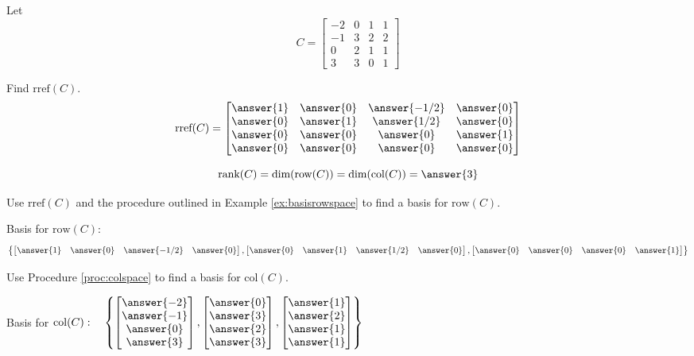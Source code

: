 \documentclass{ximera}
\begin{document}
\begin{problem}\label{prob:colrowmatrixC}
Let
$$C=\begin{bmatrix}-2&0&1&1\\-1&3&2&2\\0&2&1&1\\3&3&0&1\end{bmatrix}$$ 

\begin{problem}
Find $\mbox{rref}(C)$.
$$\mbox{rref}(C)=\begin{bmatrix}\answer{1}&\answer{0}&\answer{-1/2}&\answer{0}\\\answer{0}&\answer{1}&\answer{1/2}&\answer{0}\\\answer{0}&\answer{0}&\answer{0}&\answer{1}\\\answer{0}&\answer{0}&\answer{0}&\answer{0}\end{bmatrix}$$
\end{problem}

\begin{problem}
$$\mbox{rank}(C)=\mbox{dim}(\mbox{row}(C))=\mbox{dim}(\mbox{col}(C))=\answer{3}$$
\end{problem}

\begin{problem}
Use $\mbox{rref}(C)$ and the procedure outlined in Example \ref{ex:basisrowspace} to find a basis for $\mbox{row}(C)$.

Basis for $\mbox{row}(C):$
$$\left\{\begin{bmatrix}\answer{1}& \answer{0}& \answer{-1/2}&\answer{0}\end{bmatrix},\begin{bmatrix}\answer{0} & \answer{1}& \answer{1/2}&\answer{0}\end{bmatrix}, \begin{bmatrix}\answer{0}&\answer{0}&\answer{0}&\answer{1}\end{bmatrix} \right\}$$
\end{problem}

\begin{problem}
Use Procedure \ref{proc:colspace} to find a basis for $\mbox{col}(C)$.

Basis for $\mbox{col}(C):\quad
\left\{ \begin{bmatrix}\answer{-2}\\\answer{-1}\\\answer{0}\\\answer{3}\end{bmatrix}, \begin{bmatrix}\answer{0}\\\answer{3}\\\answer{2}\\\answer{3}\end{bmatrix}, \begin{bmatrix}\answer{1}\\\answer{2}\\\answer{1}\\\answer{1}\end{bmatrix}\right\}$
\end{problem}
\end{problem}
\end{document}
